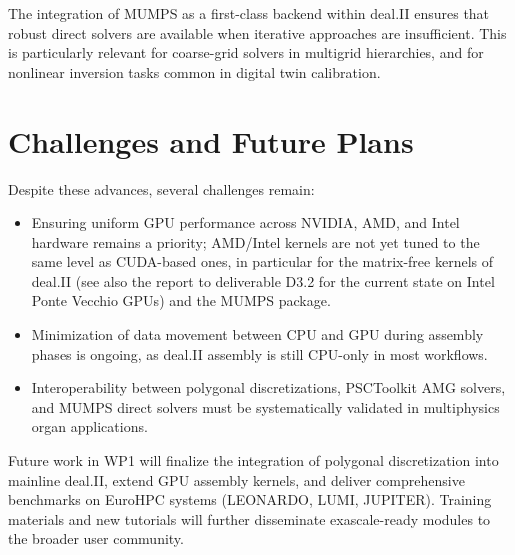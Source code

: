 \documentclass[a4paper,12pt]{article}
\begin{document}
The integration of MUMPS as a first-class backend within deal.II ensures that
robust direct solvers are available when iterative approaches are insufficient.
This is particularly relevant for coarse-grid solvers in multigrid hierarchies,
and for nonlinear inversion tasks common in digital twin calibration.

\section{Challenges and Future Plans}

Despite these advances, several challenges remain:

\begin{itemize}
\item Ensuring uniform GPU performance across NVIDIA, AMD, and Intel hardware
  remains a priority; AMD/Intel kernels are not yet tuned to the same level as
  CUDA-based ones, in particular for the matrix-free kernels of deal.II (see
  also the report to deliverable D3.2 for the current state on Intel Ponte
  Vecchio GPUs) and the MUMPS package.
  \item Minimization of data movement between CPU and GPU during assembly phases
        is ongoing, as deal.II assembly is still CPU-only in most workflows.
  \item Interoperability between polygonal discretizations, PSCToolkit AMG
        solvers, and MUMPS direct solvers must be systematically validated in
        multiphysics organ applications.
\end{itemize}

Future work in WP1 will finalize the integration of polygonal discretization
into mainline deal.II, extend GPU assembly kernels, and deliver comprehensive
benchmarks on EuroHPC systems (LEONARDO, LUMI, JUPITER). Training materials and
new tutorials will further disseminate exascale-ready modules to the broader
user community.

\label{MyLastPage}
\end{document}
